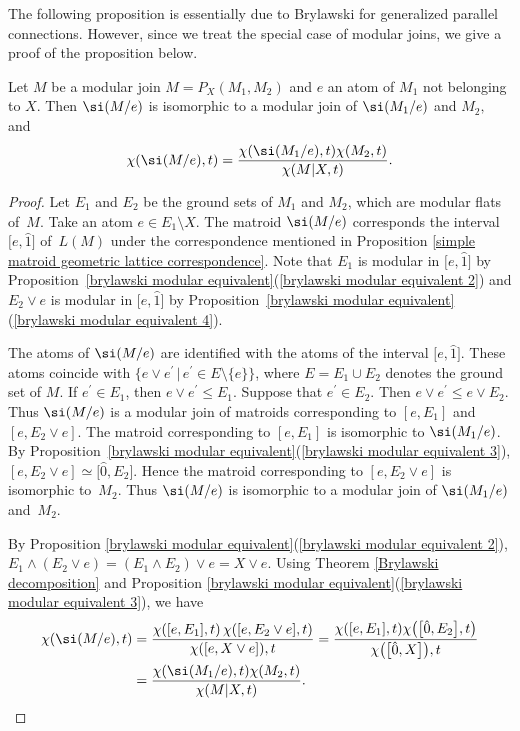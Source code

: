 The following proposition is essentially due to Brylawski for generalized parallel connections.
However, since we treat the special case of modular joins, we give a proof of the proposition below.
\begin{Proposition}\label{Brylawski contraction}
Let $ M $ be a modular join $ M=P_{X}(M_{1},M_{2}) $ and $ e $ an atom of $ M_{1} $ not belonging to $ X $.
Then $ \si(M/e) $ is isomorphic to a modular join of $ \si(M_{1}/e) $ and $ M_{2}, $ and
\begin{align*}
\chi(\si(M/e),t) = \dfrac{\chi(\si(M_{1}/e),t) \chi(M_{2}, t)}{\chi(M|X, t)}.
\end{align*}
\end{Proposition}
\begin{proof}
Let $ E_{1} $ and $ E_{2} $ be the ground sets of $ M_{1} $ and $ M_{2} $, which are modular flats of~$ M $.
Take an atom $ e \in E_{1} \setminus X $.
The matroid $ \si(M/e) $ corresponds the interval $ \big[e, \hat{1}\big] $ of~$ L(M) $ under the correspondence mentioned in Proposition \ref{simple matroid geometric lattice correspondence}.
Note that $ E_{1} $ is modular in $ \big[e, \hat{1}\big] $ by Proposition~\ref{brylawski modular equivalent}(\ref{brylawski modular equivalent 2}) and $ E_{2} \vee e $ is modular in $ \big[e, \hat{1}\big] $ by Proposition~\ref{brylawski modular equivalent}(\ref{brylawski modular equivalent 4}).

The atoms of $ \si(M/e) $ are identified with the atoms of the interval $ \big[e, \hat{1}\big] $.
These atoms coincide with $ \{ e \vee e^{\prime} \,|\, e^{\prime} \in E\setminus \{e\} \} $, where $ E = E_{1} \cup E_{2} $ denotes the ground set of $ M $.
If $ e^{\prime} \in E_{1} $, then $ e \vee e^{\prime} \leq E_{1} $.
Suppose that $ e^{\prime} \in E_{2} $.
Then $ e \vee e^{\prime} \leq e \vee E_{2} $.
Thus $ \si(M/e) $ is a modular join of matroids corresponding to $ [e, E_{1}] $ and $ [e, E_{2} \vee e] $.
The matroid corresponding to $ [e, E_{1}] $ is isomorphic to $ \si(M_{1}/e) $.
By Proposition~\ref{brylawski modular equivalent}(\ref{brylawski modular equivalent 3}), $ [e, E_{2} \vee e] \simeq \big[\hat{0}, E_{2}\big] $. Hence the matroid corresponding to $ [e, E_{2} \vee e] $ is isomorphic to~$ M_{2} $.
Thus $ \si(M/e) $ is isomorphic to a modular join of $ \si(M_{1}/e) $ and~$ M_{2} $.

By Proposition \ref{brylawski modular equivalent}(\ref{brylawski modular equivalent 2}), $ E_{1} \wedge (E_{2} \vee e) = (E_{1} \wedge E_{2}) \vee e = X \vee e $.
Using Theorem \ref{Brylawski decomposition} and Proposition \ref{brylawski modular equivalent}(\ref{brylawski modular equivalent 3}), we have
\begin{align*}
\chi(\si(M/e),t)& = \dfrac{\chi([e, E_{1}],t) \, \chi([e, E_{2}\vee e], t)}{\chi([e,X \vee e]), t}
= \dfrac{\chi([e, E_{1}],t) \chi\big(\big[\hat{0}, E_{2}\big], t\big)}{\chi\big(\big[\hat{0},X\big]\big), t} \\
&= \dfrac{\chi(\si(M_{1}/e),t) \chi(M_{2}, t)}{\chi(M|X, t)}.\tag*{\qed}
\end{align*}\renewcommand{\qed}{}
\end{proof}

